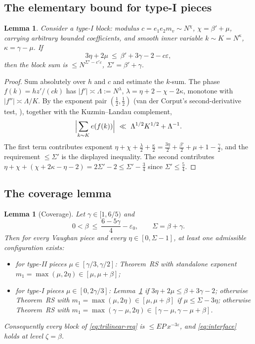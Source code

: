 \documentclass[11pt]{article}
\newtheorem{lemma}[theorem]{Lemma}
\theoremstyle{remark}
\newcommand{\N}{N}
\newcommand{\eof}[1]{e\!\left(#1\right)}
\begin{document}
\subsection{The elementary bound for type-I pieces}\label{sec:elementary}

\begin{lemma}\label{lem:elementary}
Consider a type-I block: modulus $c=e_1e_2m_v\sim \N^{\chi}$, $\chi=\beta'+\mu$,
carrying arbitrary bounded coefficients, and smooth inner variable
$k\sim K=\N^{\kappa}$, $\kappa=\gamma-\mu$. If
\[
3\eta+2\mu\ \le\ \beta'+3\gamma-2 - c\varepsilon,
\]
then the block sum is $\le \N^{\Sigma'-c'\varepsilon}$, $\Sigma'=\beta'+\gamma$.
\end{lemma}

\begin{proof}
Sum absolutely over $h$ and $c$ and estimate the $k$-sum. The phase
$f(k)=hz'/(ck)$ has $|f'|\asymp \Lambda:=\N^{\lambda}$,
$\lambda=\eta+2-\chi-2\kappa$, monotone with $|f''|\asymp\Lambda/K$. By the
exponent pair $(\tfrac12,\tfrac12)$ (van der Corput's second-derivative test,
\cite[Thm.~2.2]{GK}), together with the Kuzmin--Landau complement,
\[
\Bigl|\sum_{k\sim K}\eof{f(k)}\Bigr|\ \ll\ \Lambda^{1/2}K^{1/2}+\Lambda^{-1}.
\]
The first term contributes exponent
$\eta+\chi+\tfrac{\lambda}{2}+\tfrac{\kappa}{2}
=\tfrac{3\eta}{2}+\tfrac{\beta'}{2}+\mu+1-\tfrac{\gamma}{2}$, and the requirement
$\le \Sigma'$ is the displayed inequality. The second contributes
$\eta+\chi+(\chi+2\kappa-\eta-2)=2\Sigma'-2\le \Sigma'-\tfrac34$ since
$\Sigma'\le\frac54$.
\end{proof}

\subsection{The coverage lemma}\label{sec:coverage}

\begin{lemma}[Coverage]\label{lem:coverage}
Let $\gamma\in[1,6/5)$ and
\[
0<\beta\ \le\ \frac{6-5\gamma}{4}-\varepsilon_0,\qquad \Sigma=\beta+\gamma .
\]
Then for every Vaughan piece and every $\eta\in[0,\Sigma-1]$, at least one admissible
configuration exists:
\begin{itemize}
\item[\emph{(II)}] for type-II pieces $\mu\in[\gamma/3,\gamma/2]$: Theorem~RS with
standalone exponent $m_1=\max(\mu,2\eta)\in[\mu,\mu+\beta]$;
\item[\emph{(I)}] for type-I pieces $\mu\in[0,2\gamma/3]$: Lemma~\ref{lem:elementary}
if $3\eta+2\mu\le\beta+3\gamma-2$; otherwise Theorem~RS with
$m_1=\max(\mu,2\eta)\in[\mu,\mu+\beta]$ if $\mu\le\Sigma-3\eta$; otherwise Theorem~RS
with $m_1=\max(\gamma-\mu,2\eta)\in[\gamma-\mu,\gamma-\mu+\beta]$.
\end{itemize}
Consequently every block of \eqref{eq:trilinear-req} is $\le EP\,x^{-3\varepsilon}$,
and \eqref{eq:interface} holds at level $\zeta=\beta$.
\end{lemma}
\end{document}
